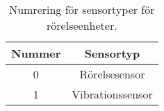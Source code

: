 \begin{table}[htb]
	\centering
	\begin{tabular}{|c|c|}
		\hline
		Nummer & Sensortyp \\ \hline \hline
		0 & Rörelsesensor \\ \hline
		1 & Vibrationssensor \\ \hline

	\end{tabular}
	\caption{Numrering för sensortyper för rörelseenheter.}
	\label{tab:sensortyper}
\end{table}
